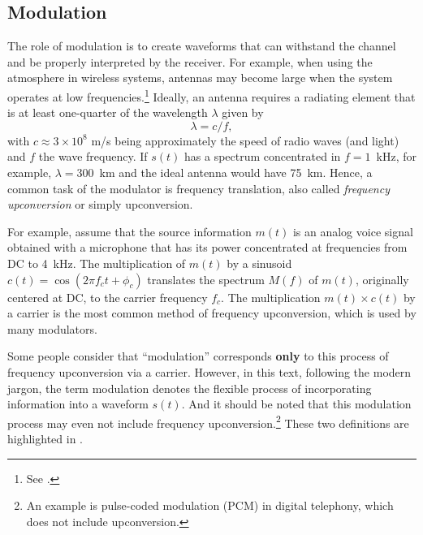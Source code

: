 \subsection{Modulation}
The role of modulation is to create waveforms that can withstand the channel and be properly interpreted by the receiver. For example, when using the atmosphere in wireless systems, antennas
may become large when the system operates at low frequencies.\footnote{\raggedright See .} Ideally, an antenna requires a radiating element that is at least one-quarter of the wavelength $\lambda$ given by
\begin{equation}
\lambda = c / f,
\label{eq:antenna}
\end{equation}
with $c \approx 3 \times 10^8$ m/s being approximately the speed of radio waves (and light) and $f$ the wave frequency. If $s(t)$ has a spectrum concentrated in $f=1$~kHz, for example, $\lambda=300$~km and the ideal antenna would have 75~km. Hence, a common task of the modulator is frequency translation, also called \emph{frequency upconversion} or simply upconversion.

For example, assume that the source information $m(t)$ is an analog voice signal obtained with a microphone that has its power concentrated at frequencies from DC to 4~kHz. The multiplication of $m(t)$ by a sinusoid $c(t)=\cos(2 \pi f_c t + \phi_c)$ translates the spectrum $M(f)$ of $m(t)$, originally centered at DC, to the carrier frequency $f_c$. The multiplication $m(t) \times c(t)$ by a carrier is the most common method of frequency upconversion, which is used by many modulators.

Some people consider that ``modulation'' corresponds \textbf{only} to this process of frequency upconversion via a carrier. 
 However, in this text, following the modern jargon, the term modulation denotes the flexible process of incorporating information into a waveform $s(t)$. And it should be noted that this modulation process may even not include frequency upconversion.\footnote{An example is pulse-coded modulation (PCM) in digital telephony, which does not include upconversion.} 
These two definitions are highlighted in .

